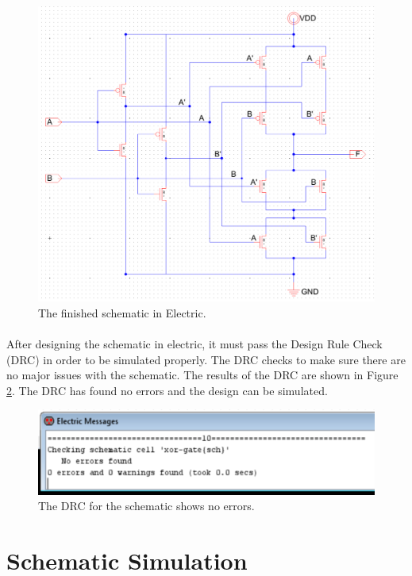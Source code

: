 \documentclass{article}
\begin{document}
  \begin{figure}[H]
    \centering
    \includegraphics[width=0.9\linewidth, frame]{screenshots/schematic.png}
    \caption{The finished schematic in Electric.}
    \label{fig:schem}
  \end{figure}

  \paragraph{}
  After designing the schematic in electric, it must pass the Design Rule Check (DRC) in order to be simulated properly. The DRC checks to make sure there are no major issues with the schematic. The results of the DRC are shown in Figure \ref{fig:sch-drc}. The DRC has found no errors and the design can be simulated.

  \begin{figure}[H]
    \centering
    \includegraphics[width=0.9\linewidth, frame]{screenshots/schematic-drc.png}
    \caption{The DRC for the schematic shows no errors.}
    \label{fig:sch-drc}
  \end{figure}

\section{Schematic Simulation}
\end{document}
